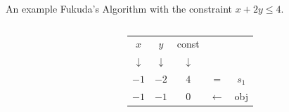 \begin{frame}{An example}
Fukuda's Algorithm with the constraint $ x+2y \leq 4 $.
\begin{columns}[c]
\begin{column}{5cm}
\end{column}
\begin{column}{5cm}
\begin{tabular}{| c | c || c || c c |}
	\hline	
	$x$ & $y$ & const & & \\
	$\downarrow$ &$\downarrow$ &$\downarrow$ & & \\
	\hline
	\hline	
   	$-1$ & $-2$ & $4$ & = & $s_1$\\ \hline \hline	
   	$-1$ & $-1$ & $0$ & $\leftarrow$ & obj \\
   	\hline	
\end{tabular}


\end{column}
\end{columns}
\end{frame}
